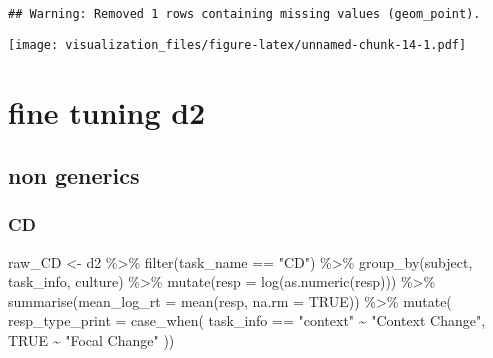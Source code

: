 \documentclass[
]{article}
\newenvironment{Shaded}{\begin{snugshade}}{\end{snugshade}}
\newcommand{\AttributeTok}[1]{\textcolor[rgb]{0.77,0.63,0.00}{#1}}
\newcommand{\ConstantTok}[1]{\textcolor[rgb]{0.00,0.00,0.00}{#1}}
\newcommand{\FunctionTok}[1]{\textcolor[rgb]{0.00,0.00,0.00}{#1}}
\newcommand{\NormalTok}[1]{#1}
\newcommand{\OtherTok}[1]{\textcolor[rgb]{0.56,0.35,0.01}{#1}}
\newcommand{\SpecialCharTok}[1]{\textcolor[rgb]{0.00,0.00,0.00}{#1}}
\newcommand{\StringTok}[1]{\textcolor[rgb]{0.31,0.60,0.02}{#1}}
\begin{document}
\begin{verbatim}
## Warning: Removed 1 rows containing missing values (geom_point).
\end{verbatim}

\texttt{[image: visualization\_files/figure-latex/unnamed-chunk-14-1.pdf]}

\hypertarget{fine-tuning-d2}{%
\section{fine tuning d2}\label{fine-tuning-d2}}

\hypertarget{non-generics-1}{%
\subsection{non generics}\label{non-generics-1}}

\hypertarget{cd}{%
\subsubsection{CD}\label{cd}}

\begin{Shaded}
\begin{Highlighting}[]
\NormalTok{raw\_CD }\OtherTok{\textless{}{-}}\NormalTok{ d2 }\SpecialCharTok{\%\textgreater{}\%} 
  \FunctionTok{filter}\NormalTok{(task\_name }\SpecialCharTok{==} \StringTok{"CD"}\NormalTok{) }\SpecialCharTok{\%\textgreater{}\%} 
  \FunctionTok{group\_by}\NormalTok{(subject, task\_info, culture) }\SpecialCharTok{\%\textgreater{}\%} 
  \FunctionTok{mutate}\NormalTok{(}\AttributeTok{resp =} \FunctionTok{log}\NormalTok{(}\FunctionTok{as.numeric}\NormalTok{(resp))) }\SpecialCharTok{\%\textgreater{}\%} 
  \FunctionTok{summarise}\NormalTok{(}\AttributeTok{mean\_log\_rt =} \FunctionTok{mean}\NormalTok{(resp, }\AttributeTok{na.rm =} \ConstantTok{TRUE}\NormalTok{)) }\SpecialCharTok{\%\textgreater{}\%} 
  \FunctionTok{mutate}\NormalTok{(}
         \AttributeTok{resp\_type\_print =} \FunctionTok{case\_when}\NormalTok{(}
\NormalTok{           task\_info }\SpecialCharTok{==} \StringTok{"context"} \SpecialCharTok{\textasciitilde{}} \StringTok{"Context Change"}\NormalTok{, }
           \ConstantTok{TRUE} \SpecialCharTok{\textasciitilde{}} \StringTok{"Focal Change"}
\NormalTok{         ))}
\end{Highlighting}
\end{Shaded}
\end{document}
